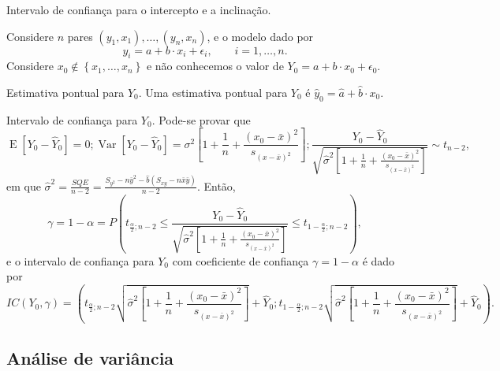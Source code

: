 \documentclass[8pt]{beamer}
\DeclareMathOperator{\espe}{E}
\DeclareMathOperator{\vari}{Var}
\begin{document}
\begin{frame}{Intervalo de confiança para o intercepto e a inclinação.}

\footnotesize
Considere $n$ pares $(y_1, x_1), \dots, (y_n, x_n)$, e o modelo dado por
$$y_i = a + b \cdot x_i + \epsilon_i, \qquad i =1, \dots, n.$$
Considere $x_0 \not\in \left\{ x_1, \dots, x_n \right\}$ e não conhecemos o valor de $Y_0 = a + b \cdot x_0 + \epsilon_0$.

\begin{block}{Estimativa pontual para $Y_0$.}
	Uma estimativa pontual para $Y_0$ é $\hat{y}_0 = \hat{a}  + \hat{b} \cdot x_0$. 
\end{block}

\begin{block}{Intervalo de confiança para $Y_0$.}
	Pode-se provar que 
	{\tiny
	$$\espe\left[Y_0 - \hat{Y}_0\right] = 0;  \vari\left[ Y_0 - \hat{Y}_0 \right] = \sigma^2 \left[ 1 + \frac{1}{n} + \frac{(x_0 - \bar{x})^2}{s_{(x-\bar{x})^2}} \right]; \frac{Y_0 - \hat{Y}_0}{ \sqrt{\hat{\sigma}^2 \left[ 1 + \frac{1}{n} + \frac{(x_0 - \bar{x})^2}{s_{(x-\bar{x})^2}} \right]}} \sim t_{n-2},$$
	}
	em que $\hat{\sigma}^2 = \frac{SQE}{n-2} = \frac{S_{y^2} -n \bar{y}^2 - \hat{b} (S_{xy} - n \bar{x} \bar{y})}{n-2}$. Então,
	{\tiny 
	$$\gamma = 1 - \alpha = P \left( t_{\frac{\alpha}{2}; n-2} \leq \frac{Y_0 - \hat{Y}_0}{\sqrt{\hat{\sigma}^2 \left[ 1 + \frac{1}{n} + \frac{(x_0 - \bar{x})^2}{s_{(x-\bar{x})^2}} \right]}} \leq t_{1-\frac{\alpha}{2}; n-2} \right),$$
	}
	e o intervalo de confiança para $Y_0$ com coeficiente de confiança $\gamma=1-\alpha$ é dado por
	{\tiny
	$$IC(Y_0, \gamma) = \left( t_{\frac{\alpha}{2}; n-2} \sqrt{\hat{\sigma}^2 \left[ 1 + \frac{1}{n} + \frac{(x_0 - \bar{x})^2}{s_{(x-\bar{x})^2}} \right]} + \hat{Y}_0 ; t_{1-\frac{\alpha}{2}; n-2} \sqrt{\hat{\sigma}^2 \left[ 1 + \frac{1}{n} + \frac{(x_0 - \bar{x})^2}{s_{(x-\bar{x})^2}} \right]} + \hat{Y}_0 \right).$$
	}
\end{block}
\normalsize

\end{frame}

\subsection{Análise de variância}
\end{document}
